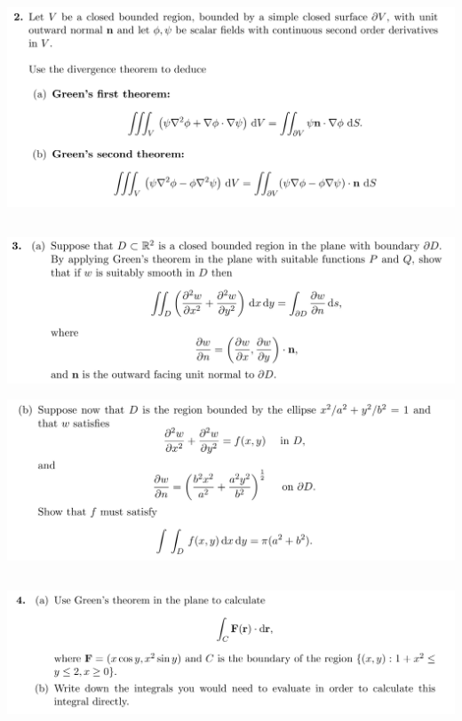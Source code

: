 \documentclass[12pt]{article}
\begin{document}
\subsection{}
\begin{mdframed}
  \includegraphics[width=400pt]{img/oxford-prelims-M5-multivariable-calc-7-2.png}
\end{mdframed}

\subsection{}
\begin{mdframed}
  \includegraphics[width=400pt]{img/oxford-prelims-M5-multivariable-calc-7-3-a.png}
\end{mdframed}

\begin{mdframed}
  \includegraphics[width=400pt]{img/oxford-prelims-M5-multivariable-calc-7-3-b.png}
\end{mdframed}

\subsection{}
\begin{mdframed}
  \includegraphics[width=400pt]{img/oxford-prelims-M5-multivariable-calc-7-4.png}
\end{mdframed}
\end{document}
